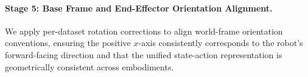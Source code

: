 
\paragraph{Stage 5: Base Frame and End-Effector Orientation Alignment.}
We apply per-dataset rotation corrections to align world-frame orientation conventions, ensuring the positive $x$-axis consistently corresponds to the robot's forward-facing direction and that the unified state-action representation is geometrically consistent across embodiments.


